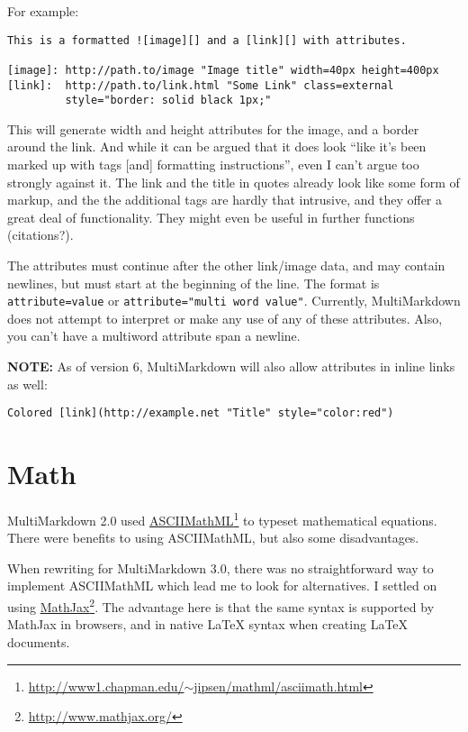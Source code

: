 For example:

\begin{verbatim}
This is a formatted ![image][] and a [link][] with attributes.

[image]: http://path.to/image "Image title" width=40px height=400px
[link]:  http://path.to/link.html "Some Link" class=external
         style="border: solid black 1px;"
\end{verbatim}

This will generate width and height attributes for the image, and a border
around the link. And while it can be argued that it does look ``like it's been
marked up with tags {[and]} formatting instructions'', even I can't argue too
strongly against it. The link and the title in quotes already look like some
form of markup, and the the additional tags are hardly that intrusive, and
they offer a great deal of functionality. They might even be useful in further
functions (citations?).

The attributes must continue after the other link\slash image data, and may contain
newlines, but must start at the beginning of the line. The format is
\texttt{attribute=value} or \texttt{attribute="multi word value"}. Currently, MultiMarkdown
does not attempt to interpret or make any use of any of these attributes.
Also, you can't have a multiword attribute span a newline.

\textbf{NOTE:} As of version 6, MultiMarkdown will also allow attributes in inline links as well:

\begin{verbatim}
Colored [link](http://example.net "Title" style="color:red")
\end{verbatim}

\section{Math}
\label{math}

MultiMarkdown 2.0 used \href{http://www1.chapman.edu/~jipsen/mathml/asciimath.html}{ASCIIMathML}\footnote{\href{http://www1.chapman.edu/~jipsen/mathml/asciimath.html}{http:\slash \slash www1.chapman.edu\slash \ensuremath{\sim}jipsen\slash mathml\slash asciimath.html}} to typeset mathematical equations. There
were benefits to using ASCIIMathML, but also some disadvantages.

When rewriting for MultiMarkdown 3.0, there was no straightforward way to
implement ASCIIMathML which lead me to look for alternatives. I settled on
using \href{http://www.mathjax.org/}{MathJax}\footnote{\href{http://www.mathjax.org/}{http:\slash \slash www.mathjax.org\slash }}. The advantage here is that the same syntax is supported by
MathJax in browsers, and in native LaTeX syntax when creating LaTeX documents.

